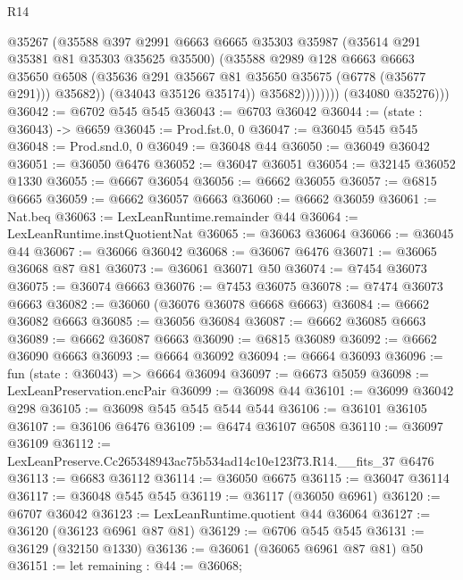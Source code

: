 \begin{lexlean}{R14}
\begin{coremodule}
                          @35267
                          (@35588
                            @397
                            @2991
                            @6663
                            @6665
                            @35303
                            @35987
                            (@35614 @291 @35381 @81 @35303 @35625 @35500)
                            (@35588
                              @2989
                              @128
                              @6663
                              @6663
                              @35650
                              @6508
                              (@35636 @291 @35667 @81 @35650 @35675 (@6778 (@35677 @291)))
                              @35682))
                          (@34043 @35126 @35174))
                        @35682))))))))
        (@34080 @35276)))
@36042 := @6702 @545 @545
@36043 := @6703 @36042
@36044 := (state : @36043) -> @6659
@36045 := Prod.fst.{0, 0}
@36047 := @36045 @545 @545
@36048 := Prod.snd.{0, 0}
@36049 := @36048 @44
@36050 := @36049 @36042
@36051 := @36050 @6476
@36052 := @36047 @36051
@36054 := @32145 @36052 @1330
@36055 := @6667 @36054
@36056 := @6662 @36055
@36057 := @6815 @6665
@36059 := @6662 @36057 @6663
@36060 := @6662 @36059
@36061 := Nat.beq
@36063 := LexLeanRuntime.remainder @44
@36064 := LexLeanRuntime.instQuotientNat
@36065 := @36063 @36064
@36066 := @36045 @44
@36067 := @36066 @36042
@36068 := @36067 @6476
@36071 := @36065 @36068 @87 @81
@36073 := @36061 @36071 @50
@36074 := @7454 @36073
@36075 := @36074 @6663
@36076 := @7453 @36075
@36078 := @7474 @36073 @6663
@36082 := @36060 (@36076 @36078 @6668 @6663)
@36084 := @6662 @36082 @6663
@36085 := @36056 @36084
@36087 := @6662 @36085 @6663
@36089 := @6662 @36087 @6663
@36090 := @6815 @36089
@36092 := @6662 @36090 @6663
@36093 := @6664 @36092
@36094 := @6664 @36093
@36096 := fun (state : @36043) => @6664 @36094
@36097 := @6673 @5059
@36098 := LexLeanPreservation.encPair
@36099 := @36098 @44
@36101 := @36099 @36042 @298
@36105 := @36098 @545 @545 @544 @544
@36106 := @36101 @36105
@36107 := @36106 @6476
@36109 := @6474 @36107 @6508
@36110 := @36097 @36109
@36112 := LexLeanPreserve.Cc265348943ac75b534ad14c10e123f73.R14.__fits_37 @6476
@36113 := @6683 @36112
@36114 := @36050 @6675
@36115 := @36047 @36114
@36117 := @36048 @545 @545
@36119 := @36117 (@36050 @6961)
@36120 := @6707 @36042
@36123 := LexLeanRuntime.quotient @44 @36064
@36127 := @36120 (@36123 @6961 @87 @81)
@36129 := @6706 @545 @545
@36131 := @36129 (@32150 @1330)
@36136 := @36061 (@36065 @6961 @87 @81) @50
@36151 := let remaining : @44 := @36068;

\end{coremodule}
\end{lexlean}
